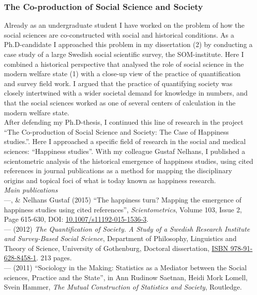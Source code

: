 \documentclass[a4paper,11pt,oneside]{article}
\begin{document}
    \subsubsection{The Co-production of Social Science and Society}
    Already as an undergraduate student I have worked on the problem of how the
    social sciences are co-constructed with social and historical conditions. As a
    Ph.D-candidate I approached this problem in my dissertation (2) by conducting a
    case study of a large Swedish social scientific survey, the SOM-institute. Here I
    combined a historical perspective that analysed the role of social science in the
    modern welfare state (1) with a close-up view of the practice of quantification and
    survey field work. I argued that the practice of quantifying society was closely
    intertwined with a wider societal demand for knowledge in numbers, and that the social
    sciences worked as one of several centers of calculation in the modern welfare state.\\

    After defending my Ph.D-thesis, I continued this line of research in the project
    ``The Co-production of Social Science and Society: The Case of Happiness studies.''.
    Here I approached a specific field of research in the social and medical sciences:
    ``Happiness studies''. With my colleague Gustaf Nelhans, I published a scientometric analysis
    of the historical emergence of happiness studies, using cited references in journal
    publications as a method for mapping the disciplinary origins and topical foci of
    what is today known as happiness research. \\


      \noindent  \emph{Main publications} \\
      ---, \& Nelhans Gustaf (2015) ``The happiness turn? Mapping the emergence of happiness studies using cited references'', \emph{Scientometrics}, Volume 103, Issue 2, Page 615-630, DOI: \href{http://dx.doi.org/10.1007/s11192-015-1536-3}{10.1007/s11192-015-1536-3}.\\
      --- (2012) \emph{The Quantification of Society. A Study of a Swedish Research Institute
      and Survey-Based Social Science}, Department of Philosophy, Linguistics and Theory of Science, University of Gothenburg, Doctoral dissertation,  \href{https://gupea.ub.gu.se/handle/2077/28807}{ISBN 978-91-628-8458-1}. 213 pages.\\
      --- (2011) ``Sociology in the Making: Statistics as a Mediator between the Social sciences, Practice and the State'', in Ann Rudinow Saetnan, Heidi Mork Lomell, Svein Hammer, \emph{The Mutual Construction of Statistics and Society}, Routledge.\\
\end{document}
